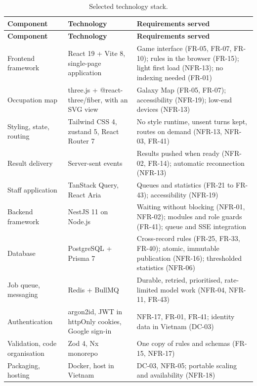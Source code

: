 {\small
\begin{longtable}{|>{\raggedright\arraybackslash}p{}|>{\raggedright\arraybackslash}p{}|>{\raggedright\arraybackslash}p{}|}
\caption{Selected technology stack.} \\
\hline
\textbf{Component} & \textbf{Technology} & \textbf{Requirements served} \\ \hline
\endfirsthead
\hline
\textbf{Component} & \textbf{Technology} & \textbf{Requirements served} \\ \hline
\endhead
Frontend framework & React 19 + Vite 8, single-page application & Game interface (FR-05, FR-07, FR-10); rules in the browser (FR-15); light first load (NFR-13); no indexing needed (FR-01) \\ \hline
Occupation map & three.js + @react-three/fiber, with an SVG view & Galaxy Map (FR-05, FR-07); accessibility (NFR-19); low-end devices (NFR-13) \\ \hline
Styling, state, routing & Tailwind CSS 4, zustand 5, React Router 7 & No style runtime, unsent turns kept, routes on demand (NFR-13, NFR-03, FR-41) \\ \hline
Result delivery & Server-sent events & Results pushed when ready (NFR-02, FR-14); automatic reconnection (NFR-13) \\ \hline
Staff application & TanStack Query, React Aria & Queues and statistics (FR-21 to FR-43); accessibility (NFR-19) \\ \hline
Backend framework & NestJS 11 on Node.js & Waiting without blocking (NFR-01, NFR-02); modules and role guards (FR-41); queue and SSE integration \\ \hline
Database & PostgreSQL + Prisma 7 & Cross-record rules (FR-25, FR-33, FR-40); atomic, immutable publication (NFR-16); thresholded statistics (NFR-06) \\ \hline
Job queue, messaging & Redis + BullMQ & Durable, retried, prioritised, rate-limited model work (NFR-04, NFR-11, FR-43) \\ \hline
Authentication & argon2id, JWT in httpOnly cookies, Google sign-in & NFR-17, FR-01, FR-41; identity data in Vietnam (DC-03) \\ \hline
Validation, code organisation & Zod 4, Nx monorepo & One copy of rules and schemas (FR-15, NFR-17) \\ \hline
Packaging, hosting & Docker, host in Vietnam & DC-03, NFR-05; portable scaling and availability (NFR-18) \\ \hline
\end{longtable}
}

